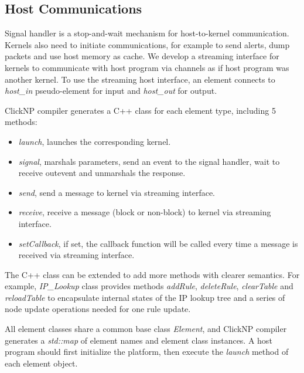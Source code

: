 \subsection{Host Communications}

Signal handler is a stop-and-wait mechanism for host-to-kernel communication. Kernels also need to initiate communications, for example to send alerts, dump packets and use host memory as cache. We develop a streaming interface for kernels to communicate with host program via channels as if host program was another kernel. To use the streaming host interface, an element connects to \textit{host\_in} pseudo-element for input and \textit{host\_out} for output.

ClickNP compiler generates a C++ class for each element type, including 5 methods:
\begin{itemize}
	\item \textit{launch}, launches the corresponding kernel.
	\item \textit{signal}, marshals parameters, send an event to the signal handler, wait to receive outevent and unmarshals the response.
	\item \textit{send}, send a message to kernel via streaming interface.
	\item \textit{receive}, receive a message (block or non-block) to kernel via streaming interface.
	\item \textit{setCallback}, if set, the callback function will be called every time a message is received via streaming interface.
\end{itemize}

The C++ class can be extended to add more methods with clearer semantics. For example, \textit{IP\_Lookup} class provides methods \textit{addRule}, \textit{deleteRule}, \textit{clearTable} and \textit{reloadTable} to encapsulate internal states of the IP lookup tree and a series of node update operations needed for one rule update.

All element classes share a common base class \textit{Element}, and ClickNP compiler generates a \textit{std::map} of element names and element class instances. A host program should first initialize the platform, then execute the \textit{launch} method of each element object.